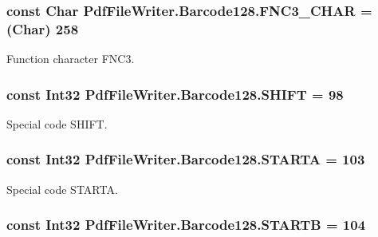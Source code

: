 \subsubsection[{\texorpdfstring{F\+N\+C3\+\_\+\+C\+H\+AR}{FNC3_CHAR}}]{\setlength{\rightskip}{0pt plus 5cm}const Char Pdf\+File\+Writer.\+Barcode128.\+F\+N\+C3\+\_\+\+C\+H\+AR = (Char) 258}\hypertarget{class_pdf_file_writer_1_1_barcode128_a346e9a6b63130b61ac4d235a4e41e4f0}{}\label{class_pdf_file_writer_1_1_barcode128_a346e9a6b63130b61ac4d235a4e41e4f0}


Function character F\+N\+C3. 

\subsubsection[{\texorpdfstring{S\+H\+I\+FT}{SHIFT}}]{\setlength{\rightskip}{0pt plus 5cm}const Int32 Pdf\+File\+Writer.\+Barcode128.\+S\+H\+I\+FT = 98}\hypertarget{class_pdf_file_writer_1_1_barcode128_a2ff0b27d774c95fa62db0b2921a3f738}{}\label{class_pdf_file_writer_1_1_barcode128_a2ff0b27d774c95fa62db0b2921a3f738}


Special code S\+H\+I\+FT. 

\subsubsection[{\texorpdfstring{S\+T\+A\+R\+TA}{STARTA}}]{\setlength{\rightskip}{0pt plus 5cm}const Int32 Pdf\+File\+Writer.\+Barcode128.\+S\+T\+A\+R\+TA = 103}\hypertarget{class_pdf_file_writer_1_1_barcode128_a053decef1788fedf3764055e70452936}{}\label{class_pdf_file_writer_1_1_barcode128_a053decef1788fedf3764055e70452936}


Special code S\+T\+A\+R\+TA. 

\subsubsection[{\texorpdfstring{S\+T\+A\+R\+TB}{STARTB}}]{\setlength{\rightskip}{0pt plus 5cm}const Int32 Pdf\+File\+Writer.\+Barcode128.\+S\+T\+A\+R\+TB = 104}\hypertarget{class_pdf_file_writer_1_1_barcode128_a68c1ce0002244e5c6243fd6cc1fed53b}{}\label{class_pdf_file_writer_1_1_barcode128_a68c1ce0002244e5c6243fd6cc1fed53b}


